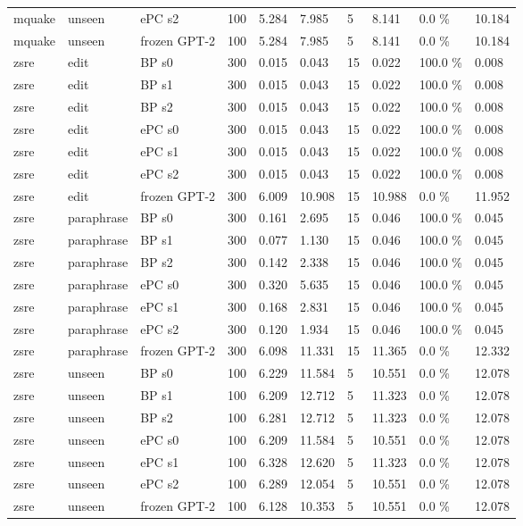 \documentclass[10pt,a4paper]{article}
\begin{document}
\begin{center}
\begin{tabularx}{\textwidth}{@{}p{}XXXXXXXXX@{}}
mquake & unseen & ePC s2 & 100 & 5.284 & 7.985 & 5 & 8.141 & 0.0 \% & 10.184 \\
mquake & unseen & frozen GPT-2 & 100 & 5.284 & 7.985 & 5 & 8.141 & 0.0 \% & 10.184 \\
zsre & edit & BP s0 & 300 & 0.015 & 0.043 & 15 & 0.022 & 100.0 \% & 0.008 \\
zsre & edit & BP s1 & 300 & 0.015 & 0.043 & 15 & 0.022 & 100.0 \% & 0.008 \\
zsre & edit & BP s2 & 300 & 0.015 & 0.043 & 15 & 0.022 & 100.0 \% & 0.008 \\
zsre & edit & ePC s0 & 300 & 0.015 & 0.043 & 15 & 0.022 & 100.0 \% & 0.008 \\
zsre & edit & ePC s1 & 300 & 0.015 & 0.043 & 15 & 0.022 & 100.0 \% & 0.008 \\
zsre & edit & ePC s2 & 300 & 0.015 & 0.043 & 15 & 0.022 & 100.0 \% & 0.008 \\
zsre & edit & frozen GPT-2 & 300 & 6.009 & 10.908 & 15 & 10.988 & 0.0 \% & 11.952 \\
zsre & paraphrase & BP s0 & 300 & 0.161 & 2.695 & 15 & 0.046 & 100.0 \% & 0.045 \\
zsre & paraphrase & BP s1 & 300 & 0.077 & 1.130 & 15 & 0.046 & 100.0 \% & 0.045 \\
zsre & paraphrase & BP s2 & 300 & 0.142 & 2.338 & 15 & 0.046 & 100.0 \% & 0.045 \\
zsre & paraphrase & ePC s0 & 300 & 0.320 & 5.635 & 15 & 0.046 & 100.0 \% & 0.045 \\
zsre & paraphrase & ePC s1 & 300 & 0.168 & 2.831 & 15 & 0.046 & 100.0 \% & 0.045 \\
zsre & paraphrase & ePC s2 & 300 & 0.120 & 1.934 & 15 & 0.046 & 100.0 \% & 0.045 \\
zsre & paraphrase & frozen GPT-2 & 300 & 6.098 & 11.331 & 15 & 11.365 & 0.0 \% & 12.332 \\
zsre & unseen & BP s0 & 100 & 6.229 & 11.584 & 5 & 10.551 & 0.0 \% & 12.078 \\
zsre & unseen & BP s1 & 100 & 6.209 & 12.712 & 5 & 11.323 & 0.0 \% & 12.078 \\
zsre & unseen & BP s2 & 100 & 6.281 & 12.712 & 5 & 11.323 & 0.0 \% & 12.078 \\
zsre & unseen & ePC s0 & 100 & 6.209 & 11.584 & 5 & 10.551 & 0.0 \% & 12.078 \\
zsre & unseen & ePC s1 & 100 & 6.328 & 12.620 & 5 & 11.323 & 0.0 \% & 12.078 \\
zsre & unseen & ePC s2 & 100 & 6.289 & 12.054 & 5 & 10.551 & 0.0 \% & 12.078 \\
zsre & unseen & frozen GPT-2 & 100 & 6.128 & 10.353 & 5 & 10.551 & 0.0 \% & 12.078 \\
\bottomrule
\end{tabularx}
\end{center}
\end{document}
